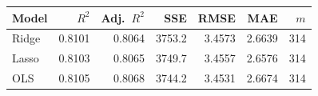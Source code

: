 \begin{tabular}{@{}lrrrrrr@{}}
\toprule
Model & $R^2$ & Adj.\ $R^2$ & SSE & RMSE & MAE & $m$ \\
\midrule
Ridge & 0.8101 & 0.8064 & 3753.2 & 3.4573 & 2.6639 & 314 \\
Lasso & 0.8103 & 0.8065 & 3749.7 & 3.4557 & 2.6576 & 314 \\
OLS & 0.8105 & 0.8068 & 3744.2 & 3.4531 & 2.6674 & 314 \\
\bottomrule
\end{tabular}